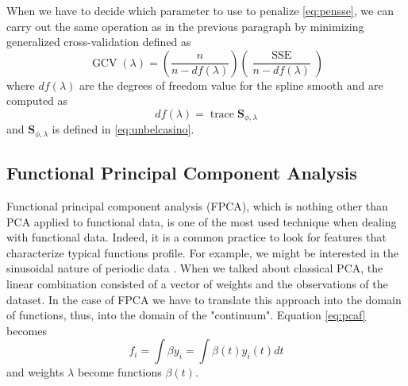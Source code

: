 When we have to decide which parameter to use to penalize \ref{eq:pensse}, we can carry out the same operation as in the previous paragraph by minimizing generalized cross-validation defined as
\begin{equation}
\label{eq:gcv}
    \operatorname{GCV}(\lambda)=\left(\frac{n}{n-d f(\lambda)}\right)\left(\frac{\operatorname{SSE}}{n-d f(\lambda)}\right)
\end{equation}
where $df(\lambda)$ are the degrees of freedom value for the spline smooth and are computed as
\begin{equation}
   df(\lambda)=\operatorname{trace} \mathbf{S}_{\phi, \lambda}
\end{equation}
and $\mathbf{S}_{\phi, \lambda}$ is defined in \ref{eq:unbelcasino}.

\subsection{Functional Principal Component Analysis}
Functional principal component analysis (FPCA), which is nothing other than PCA applied to functional data, is one of the most used technique when dealing with functional data. Indeed, it is a common practice to look for features that characterize typical functions profile. For example, we might be interested in the sinusoidal nature of periodic data \cite{ramsay_functional_2006}. When we talked about classical PCA, the linear combination consisted of a vector of weights and the observations of the dataset. In the case of FPCA we have to translate this approach into the domain of functions, thus, into the domain of the "continuum". Equation \ref{eq:pcaf} becomes
\begin{equation}
    f_i= \int \beta y_i = \int \beta(t) y_i(t) dt
\end{equation}
and weights $\lambda$ become functions $\beta(t)$. 
